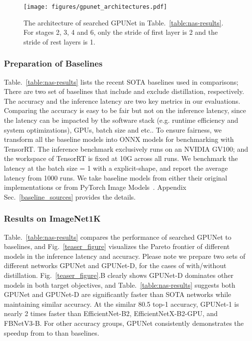 \documentclass[10pt,twocolumn,letterpaper]{article}
\begin{document}
\begin{figure}[t]
\centering 
  \begin{center}
    \texttt{[image: figures/gpunet\_architectures.pdf]}
  \end{center}
    \vspace{-0.5cm}
    \caption{The architecture of searched GPUNet in Table.~\ref{table:nas-results}. For stages 2, 3, 4 and 6, only the stride of first layer is 2 and the stride of rest layers is 1.}
    \label{fig:gpunet_architecture}
\end{figure}

\subsubsection{Preparation of Baselines}
Table.~\ref{table:nas-results} lists the recent SOTA baselines used in comparisons; There are two set of baselines that include and exclude distillation, respectively. The accuracy and the inference latency are two key metrics in our evaluations. Comparing the accuracy is easy to be fair but not on the inference latency, since the latency can be impacted by the software stack (e.g. runtime efficiency and system optimizations), GPUs, batch size and etc.. To ensure fairness, we transform all the baseline models into ONNX models for benchmarking with TensorRT. The inference benchmark exclusively runs on an NVIDIA GV100; and the workspace of TensorRT is fixed at 10G across all runs. We benchmark the latency at the batch size = 1 with a explicit-shape, and report the average latency from 1000 runs. We take baseline models from either their original implementations or from PyTorch Image Models~\cite{pytorchimagemodels}. Appendix Sec.~\ref{baseline_sources} provides the details.

\subsubsection{Results on ImageNet1K}
Table.~\ref{table:nas-results} compares the performance of searched GPUNet to baselines, and Fig.~\ref{teaser_figure} visualizes the Pareto frontier of different models in the inference latency and accuracy. Please note we prepare two sets of different networks GPUNet and GPUNet-D, for the cases of with/without distillation. Fig.~\ref{teaser_figure}.B clearly shows GPUNet-D dominates other models in both target objectives, and Table.~\ref{table:nas-results} suggests both GPUNet and GPUNet-D are significantly faster than SOTA networks while maintaining similar accuracy. At the similar 80.5 top-1 accuracy, GPUNet-1 is nearly 2 times faster than EfficientNet-B2, EfficientNetX-B2-GPU, and FBNetV3-B. For other accuracy groups, GPUNet consistently demonstrates the speedup from  to  than baselines. 
\end{document}
